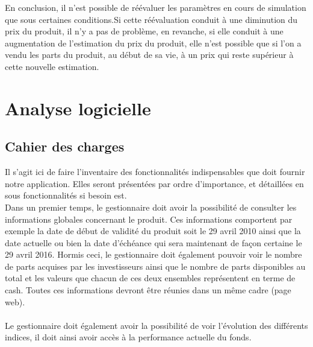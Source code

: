 \documentclass[french,12pt,a4paper]{article}
\begin{document}
En conclusion, il n'est possible de réévaluer les paramètres en cours de simulation que sous certaines conditions.Si cette réévaluation conduit à une diminution du prix du produit, il n'y a pas de problème, en revanche, si elle conduit à une augmentation de l'estimation du prix du produit, elle n'est possible que si l'on a vendu les parts du produit, au début de sa vie, à un prix qui reste supérieur à cette nouvelle estimation.



\section{Analyse logicielle}

\subsection{Cahier des charges}
Il s'agit ici de faire l'inventaire des fonctionnalités indispensables que doit fournir notre application. Elles seront présentées par ordre d'importance, et détaillées en sous fonctionnalités si besoin est.
\\
\indent Dans un premier temps, le gestionnaire doit avoir la possibilité de consulter les informations globales concernant le produit. Ces informations comportent par exemple la date de début de validité du produit soit le 29 avril  2010 ainsi que la date actuelle ou bien la date d'échéance qui sera maintenant de façon certaine le 29 avril 2016. Hormis ceci, le gestionnaire doit également pouvoir voir le nombre de parts acquises par les investisseurs ainsi que le nombre de parts disponibles au total et les valeurs que chacun de ces deux ensembles représentent en terme de cash. Toutes ces informations devront être réunies dans un même cadre (page web).\\
\indent \\
\indent Le gestionnaire doit également avoir la possibilité de voir l'évolution des différents indices, il doit ainsi avoir accès à la performance actuelle du fonds.
\end{document}

